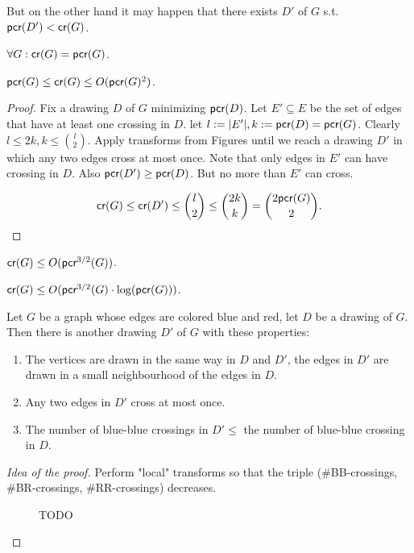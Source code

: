 But on the other hand it may happen that there exists $D'$ of $G$ s.t. $\textsf{pcr}(D') < \textsf{cr}(G)$.

\begin{conj}
	$\forall G: \textsf{cr}(G) = \textsf{pcr}(G)$.
\end{conj}

\begin{thm}
	$\textsf{pcr}(G) \leq \textsf{cr}(G) \leq O(\textsf{pcr}(G)^2)$.
\end{thm}

\begin{proof}
	Fix a drawing $D$ of $G$ minimizing $\textsf{pcr}(D)$. Let $E' \subseteq E$ be the set of edges that have at least one crossing in $D$. let $l := |E'|, k:= \textsf{pcr}(D) = \textsf{pcr}(G)$. Clearly $l \leq 2k, k \leq \binom{l}{2}$. Apply transforms from Figures  until we reach a drawing $D'$ in which any two edges cross at most once. Note that only edges in $E'$ can have crossing in $D$. Also $\textsf{pcr}(D') \geq \textsf{pcr}(D)$. But no more than $E'$ can cross.
	
	$$
	\textsf{cr}(G) \leq \textsf{cr}(D') \leq \binom{l}{2} \leq \binom{2k}{k} = \binom{2 \textsf{pcr}(G)}{2}.
	$$
\end{proof}

\begin{thm}
	$\textsf{cr}(G) \leq O(\textsf{pcr}^{3/2}(G))$.
\end{thm}

\begin{thm}
	$\textsf{cr}(G) \leq O(\textsf{pcr}^{3/2}(G) \cdot \log (\textsf{pcr}(G)))$.
\end{thm}

\begin{lemma}
	Let $G$ be a graph whose edges are colored blue and red, let $D$ be a drawing of $G$. Then there is another drawing $D'$ of $G$ with these properties:
	
	\begin{enumerate}
		\item The vertices are drawn in the same way in $D$ and $D'$, the edges in $D'$ are drawn in a small neighbourhood of the edges in $D$.
		\item Any two edges in $D'$ cross at most once.
		\item The number of blue-blue crossings in $D' \leq$ the number of blue-blue crossing in $D$.
	\end{enumerate}
	\label{blue-red}
\end{lemma}

\begin{proof}[Idea of the proof]
	Perform "local" transforms so that the triple (\#BB-crossings, \#BR-crossings, \#RR-crossings) decreases.
	
	\begin{figure}
		\caption{TODO}
	\end{figure}
\end{proof}

